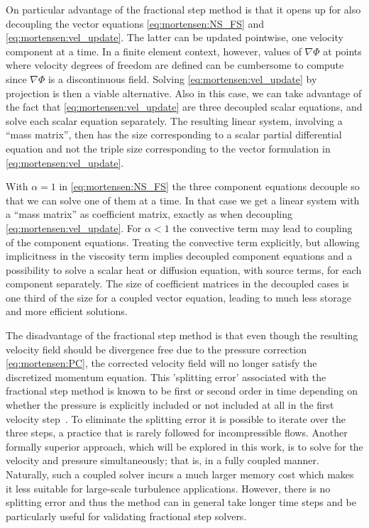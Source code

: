 On particular advantage of the fractional step method is that it opens
up for also decoupling the vector equations \eqref{eq:mortensen:NS_FS}
and \eqref{eq:mortensen:vel_update}. The latter can be updated
pointwise, one velocity component at a time. In a finite element
context, however, values of $\nabla\Phi$ at points where velocity
degrees of freedom are defined can be cumbersome to compute since
$\nabla\Phi$ is a discontinuous field. Solving
\eqref{eq:mortensen:vel_update} by projection is then a viable
alternative. Also in this case, we can take advantage of the fact that
\eqref{eq:mortensen:vel_update} are three decoupled scalar equations,
and solve each scalar equation separately.  The resulting linear
system, involving a ``mass matrix'', then has the size corresponding
to a scalar partial differential equation and not the triple size
corresponding to the vector formulation in
\eqref{eq:mortensen:vel_update}.

With $\alpha =1$ in \eqref{eq:mortensen:NS_FS} the three component
equations decouple so that we can solve one of them at a time. In that
case we get a linear system with a ``mass matrix'' as coefficient
matrix, exactly as when decoupling \eqref{eq:mortensen:vel_update}.
For $\alpha <1$ the convective term may lead to coupling of the
component equations. Treating the convective term explicitly, but
allowing implicitness in the viscosity term implies decoupled
component equations and a possibility to solve a scalar heat or
diffusion equation, with source terms, for each component separately.
The size of coefficient matrices in the decoupled cases is one third
of the size for a coupled vector equation, leading to much less
storage and more efficient solutions.

The disadvantage of the fractional step method is that even though the
resulting velocity field should be divergence free due to the pressure
correction \eqref{eq:mortensen:PC}, the corrected velocity field will
no longer satisfy the discretized momentum equation. This 'splitting
error' associated with the fractional step method is known to be first
or second order in time depending on whether the pressure is
explicitly included or not included at all in the first velocity
step~\citep{GuermondMinevShen2006}. To eliminate the splitting error
it is possible to iterate over the three steps, a practice that is
rarely followed for incompressible flows. Another formally superior
approach, which will be explored in this work, is to solve for the
velocity and pressure simultaneously; that is, in a fully coupled
manner.  Naturally, such a coupled solver incurs a much larger memory
cost which makes it less suitable for large-scale turbulence
applications. However, there is no splitting error and thus the method
can in general take longer time steps and be particularly useful for
validating fractional step solvers.

